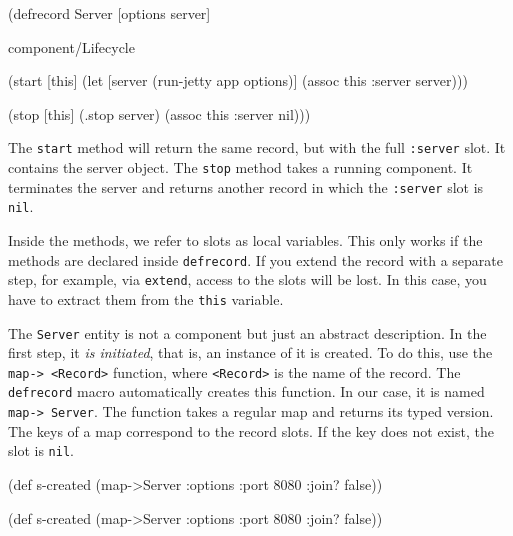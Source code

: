 \else

\begin{english}
  \begin{clojure}
(defrecord Server [options server]

  component/Lifecycle

  (start [this]
    (let [server (run-jetty app options)]
      (assoc this :server server)))

  (stop [this]
    (.stop server)
    (assoc this :server nil)))
  \end{clojure}
\end{english}
\fi

The \verb|start| method will return the same record, but with the full \verb|:server| slot. It contains the server object. The \verb|stop| method takes a running component. It terminates the server and returns another record in which the \verb|:server| slot is \verb|nil|.


Inside the methods, we refer to slots as local variables. This only works if the methods are declared inside \verb|defrecord|. If you extend the record with a separate step, for example, via \verb|extend|, access to the slots will be lost. In this case, you have to extract them from the \verb|this| variable.

The \verb|Server| entity is not a component but just an abstract description. In the first step, it \emph{is initiated}, that is, an instance of it is created. To do this, use the \verb|map-> <Record>| function, where \verb|<Record>| is the name of the record. The \verb|defrecord| macro automatically creates this function. In our case, it is named \verb|map-> Server|. The function takes a regular map and returns its typed version. The keys of a map correspond to the record slots. If the key does not exist, the slot is \verb|nil|.

\ifnarrow

\begin{english}
  \begin{clojure}
(def s-created
  (map->Server
    {:options {:port 8080
               :join? false}}))
  \end{clojure}
\end{english}

\else

\begin{english}
  \begin{clojure}
(def s-created
  (map->Server {:options {:port 8080 :join? false}}))
  \end{clojure}
\end{english}

